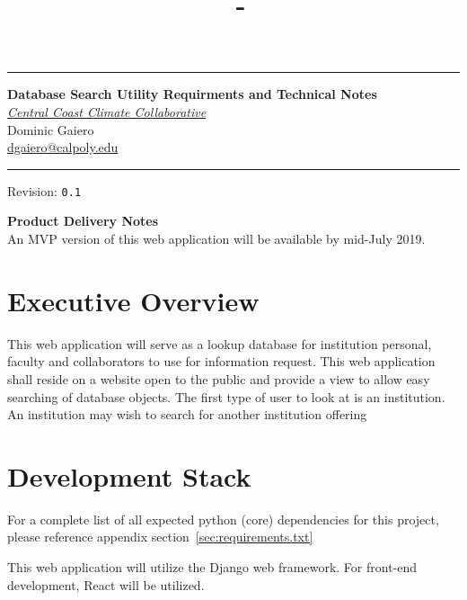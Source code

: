 \documentclass[11pt, hidelinks, letterpaper, obeyspaces]{article}
\author{\authorName}
\title{\documentTitle\ - \clientName}
\makeatletter
\newcommand{\documentTitle}{Database Search Utility Requirments and Technical
  Notes}
\newcommand{\clientName}{Central Coast Climate Collaborative}
\newcommand{\authorName}{Dominic Gaiero}
\newcommand{\authorEmail}{\href{mailto:dgaiero@calpoly.edu}
  {\url{dgaiero@calpoly.edu}}}
\newcommand{\revNumber}{\texttt{0.1}}
\makeatother
\begin{document}
\begin{titlepage}
    \setlength{\parindent}{0pt}
    \setlength{\parskip}{0pt}
    \rule{\linewidth}{2pt}
    \begin{flushleft}
    \Huge \textbf{\documentTitle} \\
    \Large \textit{\href{https://www.centralcoastclimate.org}
      {\url{\clientName}}} \\[14pt]
    \Large \authorName\\
    \normalsize \authorEmail
    \end{flushleft}
    \rule{\linewidth}{1pt}
    Revision: \revNumber
\end{titlepage}
\newpage
\tableofcontents\thispagestyle{fancy}

\begin{shadowbox}
  \large \textbf{Product Delivery Notes}\\
  \normalsize
   An MVP version of this web application will be available by mid-July 2019.
\end{shadowbox}

\newpage
\section{Executive Overview}\thispagestyle{fancy}
This web application will serve as a lookup database for institution personal,
faculty and collaborators to use for information request.
This web application shall reside on a website open to the public and provide
a view to allow easy searching of database objects.
The first type of user to look at is an institution. An institution may wish to
search for another institution offering 
\section{Development Stack}\thispagestyle{fancy}
For a complete list of all expected python (core) dependencies for this project,
please reference appendix section~\ref{sec:requirements.txt}
\par This web application will utilize the Django web framework. For front-end
development, React will be utilized.
\end{document}
